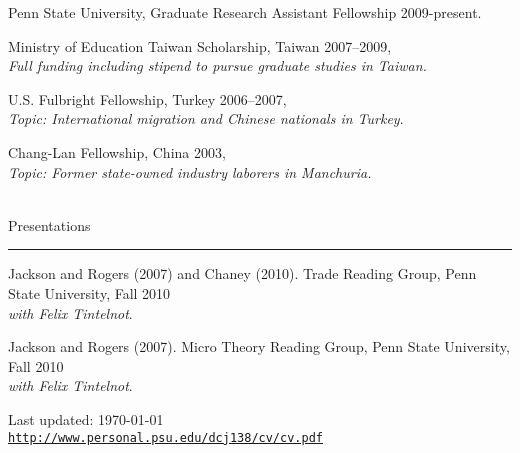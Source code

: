 \documentclass[letterpaper]{article}
\def\footerlink{http://www.personal.psu.edu/dcj138/cv/cv.pdf}
\renewenvironment{itemize}{
  \begin{list}{}{
    \setlength{\leftmargin}{1.5em}
  }
}{
  \end{list}
}
\begin{document}
\begin{itemize}
\item Penn State University, Graduate Research Assistant Fellowship 2009-present.
\item Ministry of Education Taiwan Scholarship, Taiwan 2007--2009,\\
	\hspace*{1cm}\emph{Full funding including stipend to pursue graduate studies in Taiwan.}
\item U.S. Fulbright Fellowship, Turkey 2006--2007,\\
	\hspace*{1cm}\emph{Topic: International migration and Chinese nationals in Turkey}.
\item Chang-Lan Fellowship, China 2003,\\
	\hspace*{1cm}\emph{Topic: Former state-owned industry laborers in Manchuria.} \\ \\
\end{itemize}

\vspace{4mm}
{\Large Presentations}
\vspace{1mm}
 \hrule

\begin{itemize}
\item Jackson and Rogers (2007) and Chaney (2010). Trade Reading Group, Penn State University, Fall 2010\\
\hspace*{1cm}\emph{with Felix Tintelnot}.
\item Jackson and Rogers (2007). Micro Theory Reading Group, Penn State University, Fall 2010\\
\hspace*{1cm}\emph{with Felix Tintelnot}.
\item 

\end{itemize}

\bigskip

\begin{center}
  \begin{footnotesize}
    Last updated: \today \\
    \href{\footerlink}{\texttt{\footerlink}}
  \end{footnotesize}
\end{center}
\end{document}
